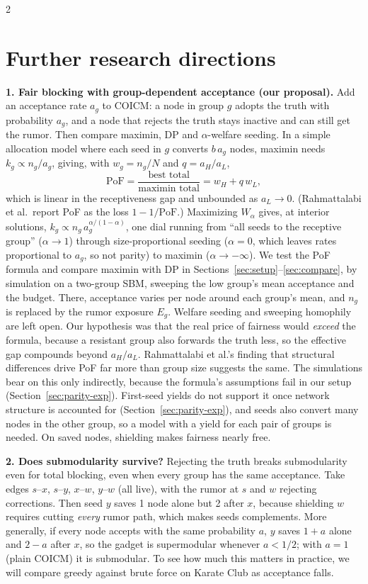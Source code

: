 \documentclass[11pt]{article}
\begin{document}
\begin{multicols}{2}
\section{Further research directions}
\textbf{1. Fair blocking with group-dependent acceptance (our proposal).} Add an acceptance rate $a_g$ to COICM: a node in group $g$ adopts the truth with probability $a_g$, and a node that rejects the truth stays inactive and can still get the rumor. Then compare maximin, DP and $\alpha$-welfare seeding. In a simple allocation model where each seed in $g$ converts $b\,a_g$ nodes, maximin needs $k_g\propto n_g/a_g$, giving, with $w_g=n_g/N$ and $q=a_H/a_L$,
\[
\mathrm{PoF}=\frac{\text{best total}}{\text{maximin total}}=w_H+q\,w_L ,
\]
which is linear in the receptiveness gap and unbounded as $a_L\to0$. (Rahmattalabi et al.\ report PoF as the loss $1-1/\mathrm{PoF}$.) Maximizing $W_\alpha$ gives, at interior solutions, $k_g\propto n_g\,a_g^{\alpha/(1-\alpha)}$, one dial running from ``all seeds to the receptive group'' ($\alpha\to1$) through size-proportional seeding ($\alpha=0$, which leaves rates proportional to $a_g$, so not parity) to maximin ($\alpha\to-\infty$). We test the PoF formula and compare maximin with DP in Sections~\ref{sec:setup}--\ref{sec:compare}, by simulation on a two-group SBM, sweeping the low group's mean acceptance and the budget. There, acceptance varies per node around each group's mean, and $n_g$ is replaced by the rumor exposure $E_g$. Welfare seeding and sweeping homophily are left open. Our hypothesis was that the real price of fairness would \emph{exceed} the formula, because a resistant group also forwards the truth less, so the effective gap compounds beyond $a_H/a_L$. Rahmattalabi et al.'s finding that structural differences drive PoF far more than group size suggests the same. The simulations bear on this only indirectly, because the formula's assumptions fail in our setup (Section~\ref{sec:parity-exp}). First-seed yields do not support it once network structure is accounted for (Section~\ref{sec:parity-exp}), and seeds also convert many nodes in the other group, so a model with a yield for each pair of groups is needed. On saved nodes, shielding makes fairness nearly free.

\textbf{2. Does submodularity survive?} Rejecting the truth breaks submodularity even for total blocking, even when every group has the same acceptance. Take edges $s$--$x$, $s$--$y$, $x$--$w$, $y$--$w$ (all live), with the rumor at $s$ and $w$ rejecting corrections. Then seed $y$ saves 1 node alone but 2 after $x$, because shielding $w$ requires cutting \emph{every} rumor path, which makes seeds complements. More generally, if every node accepts with the same probability $a$, $y$ saves $1+a$ alone and $2-a$ after $x$, so the gadget is supermodular whenever $a<1/2$; with $a=1$ (plain COICM) it is submodular. To see how much this matters in practice, we will compare greedy against brute force on Karate Club as acceptance falls.


\end{multicols}
\end{document}
